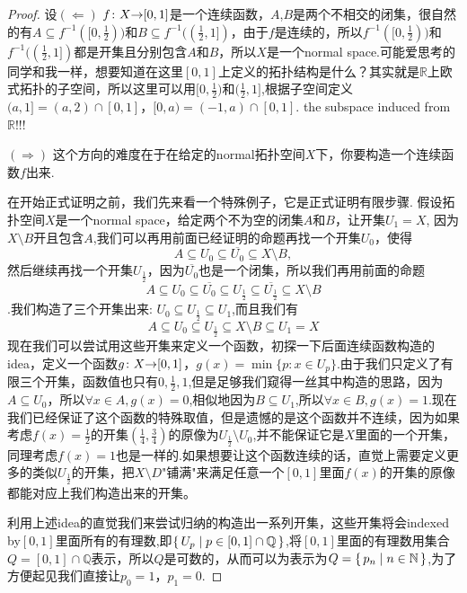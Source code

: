 \begin{proof}
设$(\Leftarrow)$ ${f}\colon{X}{\to}{[0,1]}$是一个连续函数，$A$,$B$是两个不相交的闭集，很自然的有$A \subseteq f^{-1}([0,\frac{1}{2}))$和$B \subseteq f^{-1}((\frac{1}{2},1])$，由于$f$是连续的，所以$f^{-1}([0,\frac{1}{2}))$和$f^{-1}((\frac{1}{2},1])$都是开集且分别包含$A$和$B$，所以$X$是一个normal space.可能爱思考的同学和我一样，想要知道在这里$[0,1]$上定义的拓扑结构是什么？其实就是$\mathbb{R}$上欧式拓扑的子空间，所以这里可以用$[0,\frac{1}{2})$和$(\frac{1}{2},1]$,根据子空间定义$(a,1]=(a,2)\cap[0,1]$，$[0,a)=(−1,a)∩[0,1]$. the subspace induced from $\mathbb{R}$!!! 

$(\Rightarrow)$ 这个方向的难度在于在给定的normal拓扑空间$X$下，你要构造一个连续函数$f$出来.

在开始正式证明之前，我们先来看一个特殊例子，它是正式证明有限步骤. 假设拓扑空间$X$是一个normal space，给定两个不为空的闭集$A$和$B$，让开集$U_1 = X$, 因为$X \setminus B$开且包含$A$,我们可以再用前面已经证明的命题再找一个开集$U_0$，使得\[A \subseteq U_0 \subseteq \overline{U_0} \subseteq X \setminus B,\]然后继续再找一个开集$U_{\frac{1}{2}}$，因为$\overline{U_0}$也是一个闭集，所以我们再用前面的命题\[A \subseteq U_0 \subseteq \overline{U_0} \subseteq U_{\frac{1}{2}} \subseteq \overline{U_{\frac{1}{2}}} \subseteq X \setminus B\].我们构造了三个开集出来: $U_0 \subseteq U_{\frac{1}{2}} \subseteq U_1$,而且我们有\[A \subseteq U_0 \subseteq U_{\frac{1}{2}} \subseteq X \setminus B \subseteq U_1 =X \]现在我们可以尝试用这些开集来定义一个函数，初探一下后面连续函数构造的idea，定义一个函数${g}\colon{X}{\to}{[0,1]}$，$g(x)=\min\{p \colon x \in U_p\}$.由于我们只定义了有限三个开集，函数值也只有$0,\frac{1}{2},1$,但是足够我们窥得一丝其中构造的思路，因为$A \subseteq U_0$，所以$\forall x \in A,g(x)=0$,相似地因为$B \subseteq U_1$,所以$\forall x \in B,g(x)=1$.现在我们已经保证了这个函数的特殊取值，但是遗憾的是这个函数并不连续，因为如果考虑$f(x)=\frac{1}{2}$的开集$(\frac{1}{4},\frac{3}{4})$的原像为$U_{\frac{1}{2}} \setminus U_0$,并不能保证它是$X$里面的一个开集，同理考虑$f(x)=1$也是一样的.如果想要让这个函数连续的话，直觉上需要定义更多的类似$U_{\frac{1}{2}}$的开集，把$X \setminus D$"铺满"来满足任意一个$[0,1]$里面$f(x)$的开集的原像都能对应上我们构造出来的开集。


利用上述idea的直觉我们来尝试归纳的构造出一系列开集，这些开集将会indexed by$[0,1]$里面所有的有理数,即$\{\,U_p\mid p \in [0,1] \cap \mathbb{Q}\,\}$,将$[0,1]$里面的有理数用集合$Q=[0,1] \cap \mathbb{Q}$表示，所以$Q$是可数的，从而可以为表示为$Q=\{\,p_n\mid n \in \mathbb{N}\,\}$,为了方便起见我们直接让$p_0 = 1$，$p_1 = 0$.


\end{proof}
